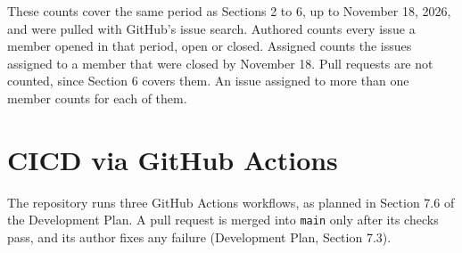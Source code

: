\documentclass{article}
\begin{document}
These counts cover the same period as Sections 2 to 6, up to November 18,
2026, and were pulled with GitHub's issue search. Authored counts every issue
a member opened in that period, open or closed. Assigned counts the issues
assigned to a member that were closed by November 18. Pull requests are not
counted, since Section 6 covers them. An issue assigned to more than one member
counts for each of them.




\section{CICD via GitHub Actions}



The repository runs three GitHub Actions workflows, as planned in Section 7.6
of the Development Plan. A pull request is merged into \texttt{main} only
after its checks pass, and its author fixes any failure (Development Plan,
Section 7.3).
\end{document}
